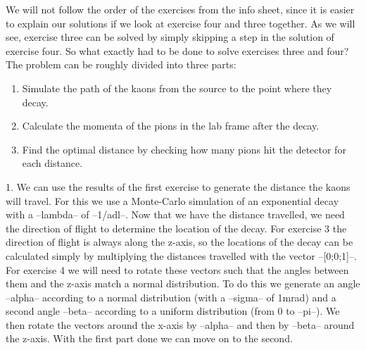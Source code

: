 \documentclass[10pt,a4paper]{report}
\begin{document}
We will not follow the order of the exercises from the info sheet, since it is easier to explain our solutions if we look at exercise four and three together. As we will see, exercise three can be solved by simply skipping a step in the solution of exercise four. So what exactly had to be done to solve exercises three and four? The problem can be roughly divided into three parts:
\begin{enumerate}
\item Simulate the path of the kaons from the source to the point where they decay.
\item Calculate the momenta of the pions in the lab frame after the decay.
\item Find the optimal distance by checking how many pions hit the detector for each distance.
\end{enumerate}

1. We can use the results of the first exercise to generate the distance the kaons will travel. For this we use a Monte-Carlo simulation of an exponential decay with a --lambda-- of --1/adl--. Now that we have the distance travelled, we need the direction of flight to determine the location of the decay. For exercise 3 the direction of flight is always along the z-axis, so the locations of the decay can be calculated simply by multiplying the distances travelled with the vector --[0;0;1]--. For exercise 4 we will need to rotate these vectors such that the angles between them and the z-axis match a normal distribution. To do this we generate an angle --alpha-- according to a normal distribution (with a --sigma-- of 1mrad) and a second angle --beta-- according to a uniform distribution (from 0 to --pi--). We then rotate the vectors around the x-axis by --alpha-- and then by --beta-- around the z-axis.
With the first part done we can move on to the second.

	
	
	
\end{document}
